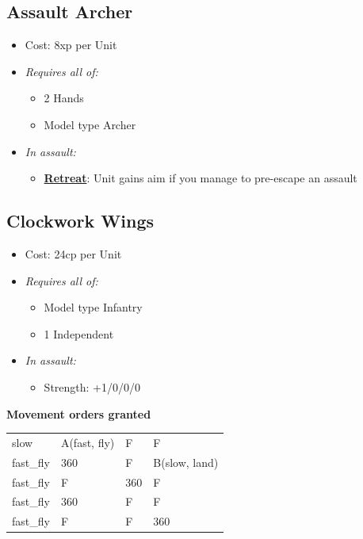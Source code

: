 \documentclass[a4paper,12pt]{article}
\begin{document}
\subsection{Assault Archer}
\label{equipment-assault-archer}

\begin{itemize}
\item Cost: 8xp per Unit
\item \textit{Requires all of:}
\begin{itemize}
\item 2 Hands
\item Model type Archer
\end{itemize}


\item \textit{In assault:}
\begin{itemize}
\item \textbf{\hyperref[rule-special-retreat]{Retreat}}: Unit gains aim if you manage to pre-escape an assault

\end{itemize}




\end{itemize}

\subsection{Clockwork Wings}
\label{equipment-clockwork-wings}

\begin{itemize}
\item Cost: 24cp per Unit
\item \textit{Requires all of:}
\begin{itemize}
\item Model type Infantry
\item 1 Independent
\end{itemize}

\item \textit{In assault:}
\begin{itemize}
\item Strength: +1/0/0/0
\end{itemize}





\end{itemize}
\noindent\textbf{Movement orders granted}

\begin{tabular}{llll}
slow & A(fast, fly) & F & F \\
fast\_fly & 360\textdegree{} & F & B(slow, land) \\
fast\_fly & F & 360\textdegree{} & F \\
fast\_fly & 360\textdegree{} & F & F \\
fast\_fly & F & F & 360\textdegree{} \\
\end{tabular}
\vspace{1ex}
\end{document}
